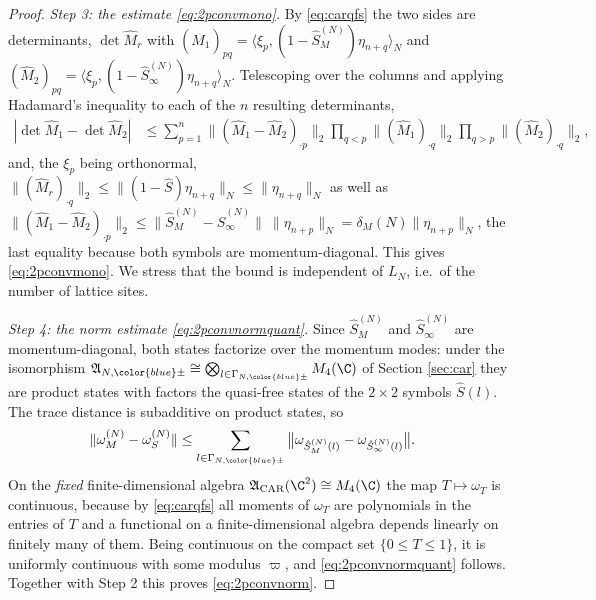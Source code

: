 \documentclass[a4paper, 11pt]{article}
\newcommand{\fA}{\mathfrak{A}}\newcommand{\cA}{\mathcal{A}}\newcommand{\dA}{\mathds{A}}\newcommand{\sA}{\mathscr{A}}
\DeclareMathOperator{\1}{\mathds{1}}
\DeclareMathOperator{\CAR}{\textup{CAR}}
\begin{document}
\begin{proof}
\emph{Step 3: the estimate \eqref{eq:2pconvmono}.} By \eqref{eq:carqfs} the two sides are determinants, $\det\hat{M}_{r}$ with $(\hat{M}_{1})_{pq} = \langle\xi_{p},(1-\hat{S}^{(N)}_{M})\eta_{n+q}\rangle_{N}$ and $(\hat{M}_{2})_{pq} = \langle\xi_{p},(1-\hat{S}^{(N)}_{\infty})\eta_{n+q}\rangle_{N}$. Telescoping over the columns and applying Hadamard's inequality to each of the $n$ resulting determinants,
\begin{align*}
|\det\hat{M}_{1}-\det\hat{M}_{2}| & \leq \sum_{p=1}^{n}\big\|(\hat{M}_{1}-\hat{M}_{2})_{\cdot p}\big\|_{2}\prod_{q<p}\big\|(\hat{M}_{1})_{\cdot q}\big\|_{2}\prod_{q>p}\big\|(\hat{M}_{2})_{\cdot q}\big\|_{2},
\end{align*}
and, the $\xi_{p}$ being orthonormal, $\|(\hat{M}_{r})_{\cdot q}\|_{2}\leq\|(1-\hat{S})\eta_{n+q}\|_{N}\leq\|\eta_{n+q}\|_{N}$ as well as $\|(\hat{M}_{1}-\hat{M}_{2})_{\cdot p}\|_{2}\leq\|\hat{S}^{(N)}_{M}-\hat{S}^{(N)}_{\infty}\|\!\ \|\eta_{n+p}\|_{N} = \delta_{M}(N)\|\eta_{n+p}\|_{N}$, the last equality because both symbols are momentum-diagonal. This gives \eqref{eq:2pconvmono}. We stress that the bound is independent of $L_{N}$, i.e.~of the number of lattice sites.

\emph{Step 4: the norm estimate \eqref{eq:2pconvnormquant}.} Since $\hat{S}^{(N)}_{M}$ and $\hat{S}^{(N)}_{\infty}$ are momentum-diagonal, both states factorize over the momentum modes: under the isomorphism $\fA_{N,{\color{blue}\pm}}\cong\bigotimes_{l\in\Gamma_{N,{\color{blue}\pm}}}M_{4}(\C)$ of Section \ref{sec:car} they are product states with factors the quasi-free states of the $2\times2$ symbols $\hat{S}(l)$. The trace distance is subadditive on product states, so
\begin{align*}
\|\omega^{(N)}_{M}-\omega^{(N)}_{S}\| & \leq \sum_{l\in\Gamma_{N,{\color{blue}\pm}}}\big\|\omega_{\hat{S}^{(N)}_{M}(l)}-\omega_{\hat{S}^{(N)}_{\infty}(l)}\big\|.
\end{align*}
On the \emph{fixed} finite-dimensional algebra $\fA_{\CAR}(\C^{2})\cong M_{4}(\C)$ the map $T\mapsto\omega_{T}$ is continuous, because by \eqref{eq:carqfs} all moments of $\omega_{T}$ are polynomials in the entries of $T$ and a functional on a finite-dimensional algebra depends linearly on finitely many of them. Being continuous on the compact set $\{0\leq T\leq1\}$, it is uniformly continuous with some modulus $\varpi$, and \eqref{eq:2pconvnormquant} follows. Together with Step 2 this proves \eqref{eq:2pconvnorm}.
\end{proof}
\end{document}
